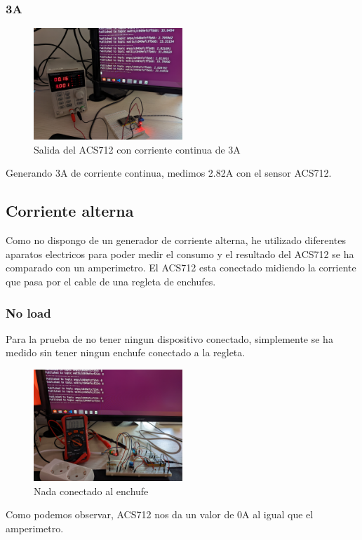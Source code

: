 \begin{titlepage}
\subsubsection{3A}
\begin{figure}[h!]
	\centering
	\includegraphics[width=0.5\textwidth]{imagenes/DC_3Amps.jpg}
	\caption{Salida del ACS712 con corriente continua de 3A}
\end{figure}
Generando 3A de corriente continua, medimos 2.82A con el sensor ACS712. \\

\subsection{Corriente alterna}
Como no dispongo de un generador de corriente alterna, he utilizado diferentes aparatos electricos para poder medir el consumo y el resultado del ACS712 se ha comparado con un amperimetro. El ACS712 esta conectado midiendo la corriente que pasa por el cable de una regleta de enchufes.\\
\subsubsection{No load}
Para la prueba de no tener ningun dispositivo conectado, simplemente se ha medido sin tener ningun enchufe conectado a la regleta.\\
\begin{figure}[h!]
	\centering
	\includegraphics[width=0.5\textwidth]{imagenes/AC_noload.jpg}
	\caption{Nada conectado al enchufe}
\end{figure}
Como podemos observar, ACS712 nos da un valor de 0A al igual que el amperimetro.


\end{titlepage}
